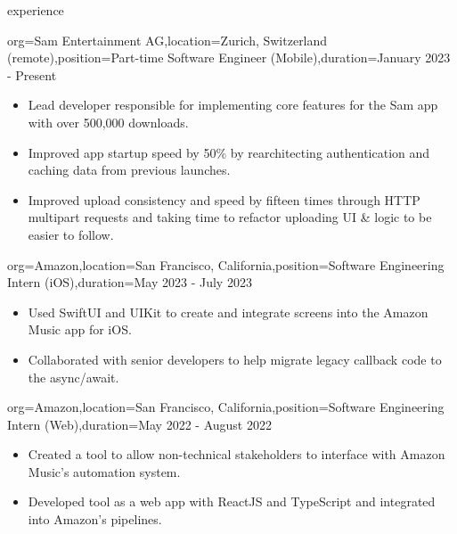 \documentclass{resume}
\begin{document}
%
\pagebreak
\makeheader

\newcommand{\skill}[2]{\textbf{#1} - #2}


\begin{ResumeSection}{experience}
    \begin{ResumeSubsection}{org={Sam Entertainment AG},location={Zurich,
        Switzerland (remote)},position={Part-time Software Engineer (Mobile)},duration={January
    2023 - Present}}
        \begin{itemize}
            \item Lead developer responsible for implementing core features for the Sam app with over 500,000
                downloads.
            \item Improved app startup speed by 50\% by rearchitecting
                authentication and caching data from previous launches.
            \item Improved upload consistency and speed by
                fifteen times through HTTP multipart requests and taking time to refactor
                uploading UI \& logic to be easier to follow.
        \end{itemize}
    \end{ResumeSubsection}

    \begin{ResumeSubsection}{org={Amazon},location={San Francisco,
        California},position={Software Engineering Intern (iOS)},duration={May 2023 -
    July 2023}}
        \begin{itemize}
            \item Used SwiftUI and UIKit to create and integrate screens into
                the Amazon Music app for iOS.
            \item Collaborated with senior developers to help migrate legacy
                callback code to the async/await.
        \end{itemize}
    \end{ResumeSubsection}
    \begin{ResumeSubsection}{org={Amazon},location={San Francisco,
        California},position={Software Engineering Intern (Web)},duration={May
    2022 - August 2022}}
        \begin{itemize}
            \item Created a tool to allow
                non-technical stakeholders to interface with Amazon Music's automation
                system.
            \item Developed tool as a web app with ReactJS and TypeScript and integrated
                into Amazon's pipelines.
        \end{itemize}
    \end{ResumeSubsection}


\end{ResumeSection}
\end{document}
